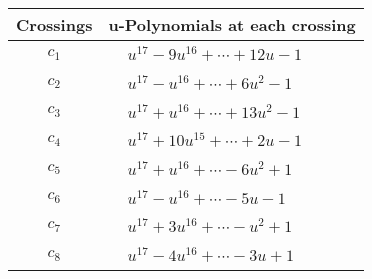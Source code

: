 \documentclass[1p]{elsarticle_modified}
\theoremstyle{definition}
\begin{document}
\begin{tabular}{m{50pt}|m{274pt}}
Crossings & \hspace{64pt}u-Polynomials at each crossing \\
\hline $$\begin{aligned}c_{1}\end{aligned}$$&$\begin{aligned}
&u^{17}-9 u^{16}+\cdots+12 u-1
\end{aligned}$\\
\hline $$\begin{aligned}c_{2}\end{aligned}$$&$\begin{aligned}
&u^{17}- u^{16}+\cdots+6 u^2-1
\end{aligned}$\\
\hline $$\begin{aligned}c_{3}\end{aligned}$$&$\begin{aligned}
&u^{17}+u^{16}+\cdots+13 u^2-1
\end{aligned}$\\
\hline $$\begin{aligned}c_{4}\end{aligned}$$&$\begin{aligned}
&u^{17}+10 u^{15}+\cdots+2 u-1
\end{aligned}$\\
\hline $$\begin{aligned}c_{5}\end{aligned}$$&$\begin{aligned}
&u^{17}+u^{16}+\cdots-6 u^2+1
\end{aligned}$\\
\hline $$\begin{aligned}c_{6}\end{aligned}$$&$\begin{aligned}
&u^{17}- u^{16}+\cdots-5 u-1
\end{aligned}$\\
\hline $$\begin{aligned}c_{7}\end{aligned}$$&$\begin{aligned}
&u^{17}+3 u^{16}+\cdots- u^2+1
\end{aligned}$\\
\hline $$\begin{aligned}c_{8}\end{aligned}$$&$\begin{aligned}
&u^{17}-4 u^{16}+\cdots-3 u+1
\end{aligned}$\\

\end{tabular}
\end{document}
